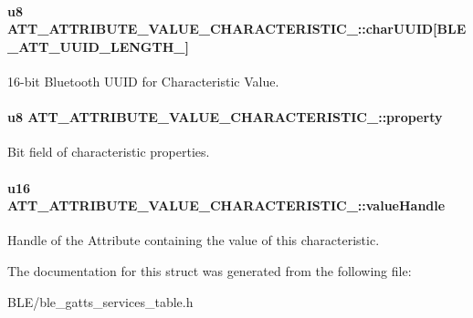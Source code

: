 \paragraph[{\texorpdfstring{char\+U\+U\+ID}{charUUID}}]{\setlength{\rightskip}{0pt plus 5cm}u8 A\+T\+T\+\_\+\+A\+T\+T\+R\+I\+B\+U\+T\+E\+\_\+\+V\+A\+L\+U\+E\+\_\+\+C\+H\+A\+R\+A\+C\+T\+E\+R\+I\+S\+T\+I\+C\+\_\+::char\+U\+U\+ID\mbox{[}{\bf B\+L\+E\+\_\+\+A\+T\+T\+\_\+\+U\+U\+I\+D\+\_\+\+L\+E\+N\+G\+T\+H\+\_}\mbox{]}}\hypertarget{struct_a_t_t___a_t_t_r_i_b_u_t_e___v_a_l_u_e___c_h_a_r_a_c_t_e_r_i_s_t_i_c__2_a15a1c5f7583a3d25efd3c23dcee4b0bf}{}\label{struct_a_t_t___a_t_t_r_i_b_u_t_e___v_a_l_u_e___c_h_a_r_a_c_t_e_r_i_s_t_i_c__2_a15a1c5f7583a3d25efd3c23dcee4b0bf}
16-\/bit Bluetooth U\+U\+ID for Characteristic Value. 
\paragraph[{\texorpdfstring{property}{property}}]{\setlength{\rightskip}{0pt plus 5cm}u8 A\+T\+T\+\_\+\+A\+T\+T\+R\+I\+B\+U\+T\+E\+\_\+\+V\+A\+L\+U\+E\+\_\+\+C\+H\+A\+R\+A\+C\+T\+E\+R\+I\+S\+T\+I\+C\+\_\+::property}\hypertarget{struct_a_t_t___a_t_t_r_i_b_u_t_e___v_a_l_u_e___c_h_a_r_a_c_t_e_r_i_s_t_i_c__2_a5b32f3cb40b6419a1b307a90edb96a07}{}\label{struct_a_t_t___a_t_t_r_i_b_u_t_e___v_a_l_u_e___c_h_a_r_a_c_t_e_r_i_s_t_i_c__2_a5b32f3cb40b6419a1b307a90edb96a07}
Bit field of characteristic properties. 
\paragraph[{\texorpdfstring{value\+Handle}{valueHandle}}]{\setlength{\rightskip}{0pt plus 5cm}u16 A\+T\+T\+\_\+\+A\+T\+T\+R\+I\+B\+U\+T\+E\+\_\+\+V\+A\+L\+U\+E\+\_\+\+C\+H\+A\+R\+A\+C\+T\+E\+R\+I\+S\+T\+I\+C\+\_\+::value\+Handle}\hypertarget{struct_a_t_t___a_t_t_r_i_b_u_t_e___v_a_l_u_e___c_h_a_r_a_c_t_e_r_i_s_t_i_c__2_a6c265249ac8027ce234d0de418211c5d}{}\label{struct_a_t_t___a_t_t_r_i_b_u_t_e___v_a_l_u_e___c_h_a_r_a_c_t_e_r_i_s_t_i_c__2_a6c265249ac8027ce234d0de418211c5d}
Handle of the Attribute containing the value of this characteristic. 

The documentation for this struct was generated from the following file\+:\begin{DoxyCompactItemize}
\item 
B\+L\+E/ble\+\_\+gatts\+\_\+services\+\_\+table.\+h\end{DoxyCompactItemize}

